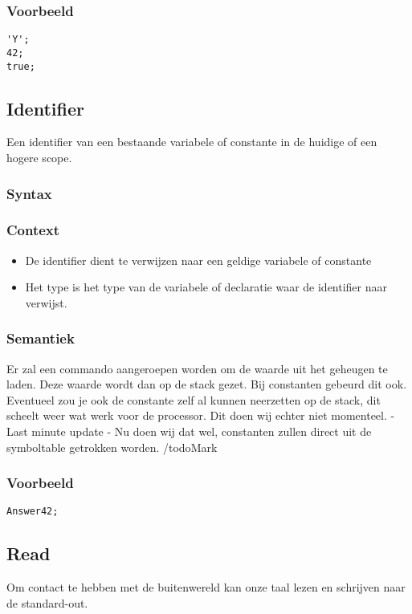 \documentclass[]{article}
\begin{document}
\subsubsection{Voorbeeld}
\begin{lstlisting}[style=SELMA]
'Y';
42;
true;
\end{lstlisting}

\subsection{Identifier}
Een identifier van een bestaande variabele of constante in de huidige of een hogere scope.
\subsubsection{Syntax}

\subsubsection{Context}
\begin{itemize}
\item De identifier dient te verwijzen naar een geldige variabele of constante
\item Het type is het type van de variabele of declaratie waar de identifier naar verwijst.
\end{itemize}
\subsubsection{Semantiek}
Er zal een commando aangeroepen worden om de waarde uit het geheugen te laden. Deze waarde wordt dan op de stack gezet. Bij constanten gebeurd dit ook. Eventueel zou je ook de constante zelf al kunnen neerzetten op de stack, dit scheelt weer wat werk voor de processor. Dit doen wij echter niet momenteel. - Last minute update - Nu doen wij dat wel, constanten zullen direct uit de symboltable getrokken worden.
/todo{Mark}
\subsubsection{Voorbeeld}
\begin{lstlisting}[style=SELMA]
Answer42;
\end{lstlisting}

\subsection{Read}
Om contact te hebben met de buitenwereld kan onze taal lezen en schrijven naar de standard-out. 
\end{document}
